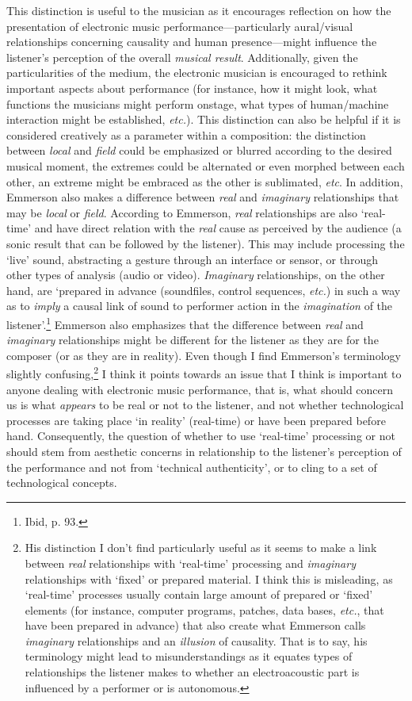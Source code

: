 This distinction is useful to the musician as it encourages reflection on how the presentation of electronic music performance---particularly aural/visual relationships concerning causality and human presence---might influence the listener's perception of the overall \emph{musical result}. Additionally, given the particularities of the medium, the electronic musician is encouraged to rethink important aspects about performance (for instance, how it might look, what functions the musicians might perform onstage, what types of human/machine interaction might be established, \emph{etc.}). This distinction can also be helpful if it is considered creatively as a parameter within a composition: the distinction between \emph{local} and \emph{field} could be emphasized or blurred according to the desired musical moment, the extremes could be alternated or even morphed between each other, an extreme might be embraced as the other is sublimated, \emph{etc}. In addition, Emmerson also makes a difference between \emph{real} and \emph{imaginary} relationships that may be \emph{local} or \emph{field}. According to Emmerson, \emph{real} relationships are also `real-time' and have direct relation with the \emph{real} cause as perceived by the audience (a sonic result that can be followed by the listener). This may include processing the `live' sound, abstracting a gesture through an interface or sensor, or through other types of analysis (audio or video). \emph{Imaginary} relationships, on the other hand, are `prepared in advance (soundfiles, control sequences,  \emph{etc.}) in such a way as to \emph{imply} a causal link of sound to performer action in the \emph{imagination} of the listener'.\footnote{Ibid, p. 93.} Emmerson also emphasizes that the difference between \emph{real} and \emph{imaginary} relationships might be different for the listener as they are for the composer (or as they are in reality). Even though I find Emmerson's terminology slightly confusing,\footnote{His distinction I don't find particularly useful as it seems to make a link between \emph{real} relationships with `real-time' processing and \emph{imaginary} relationships with `fixed' or prepared material. I think this is misleading, as `real-time' processes usually contain large amount of prepared or `fixed' elements (for instance, computer programs, patches, data bases,  \emph{etc.}, that have been prepared in advance) that also create what Emmerson calls \emph{imaginary} relationships and an \emph{illusion} of causality. That is to say, his terminology might lead to misunderstandings as it equates types of relationships the listener makes to whether an electroacoustic part is influenced by a performer or is autonomous.} I think it points towards an issue that I think is important to anyone dealing with electronic music performance, that is, what should concern us is what \emph{appears} to be real or not to the listener, and not whether technological processes are taking place `in reality' (real-time) or have been prepared before hand. Consequently, the question of whether to use `real-time' processing or not should stem from aesthetic concerns in relationship to the listener's perception of the performance and not from `technical authenticity', or to cling to a set of technological concepts.

